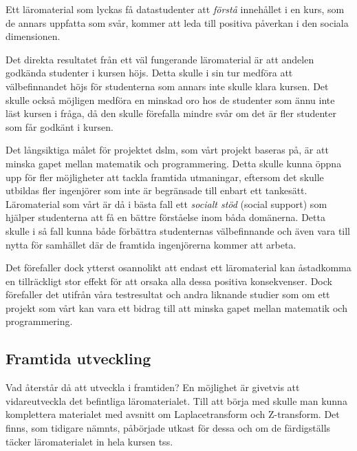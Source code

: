\documentclass[12pt,a4paper,twoside,openright]{article}
\begin{document}
Ett läromaterial som lyckas få datastudenter att \emph{förstå}
innehållet i en kurs, som de annars uppfatta som svår, kommer att leda
till positiva påverkan i den sociala
dimensionen. %

Det direkta resultatet från ett väl fungerande läromaterial är att
andelen godkända studenter i kursen höjs. Detta skulle i sin tur
medföra att välbefinnandet höjs för studenterna som annars inte skulle
klara kursen. Det skulle också möjligen medföra en minskad oro hos de
studenter som ännu inte läst kursen i fråga, då den skulle förefalla
mindre svår om det är fler studenter som får godkänt i kursen.

Det långsiktiga målet för projektet \gls{dslm}, som vårt projekt
baseras på, är att minska gapet mellan matematik och
programmering. %
Detta skulle kunna öppna upp för fler möjligheter att tackla framtida
utmaningar, eftersom det skulle utbildas fler ingenjörer som inte är
begränsade till enbart ett tankesätt.
Läromaterial som vårt är då i bästa fall ett \emph{socialt stöd} (social support)
som hjälper studenterna att få en bättre förståelse inom båda
domänerna. Detta skulle i så fall kunna både förbättra studenternas
välbefinnande och även vara till nytta för samhället där de framtida
ingenjörerna kommer att arbeta.

Det förefaller dock ytterst osannolikt att endast ett läromaterial kan
åstadkomma en tillräckligt stor effekt för att orsaka alla dessa
positiva konsekvenser. Dock förefaller det utifrån våra testresultat
och andra liknande studier som om ett projekt som vårt kan vara ett
bidrag till att minska gapet mellan matematik och programmering.

\subsection{Framtida utveckling}
Vad återstår då att utveckla i framtiden? En möjlighet är givetvis att
vidareutveckla det befintliga läromaterialet. Till att börja med
skulle man kunna komplettera materialet med avsnitt om
Laplacetransform och Z-transform. Det finns, som tidigare nämnts,
påbörjade utkast för dessa och om de färdigställs täcker
läromaterialet in hela kursen \gls{tss}.
\end{document}
